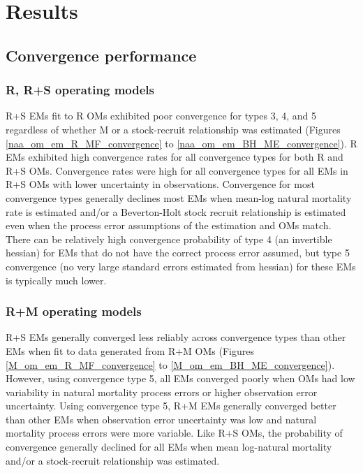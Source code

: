 \documentclass[
  12pt,
]{article}
\begin{document}
\hypertarget{results}{%
\section*{Results}\label{results}}

\hypertarget{convergence-performance}{%
\subsection*{Convergence performance}\label{convergence-performance}}

\hypertarget{r-rs-operating-models}{%
\subsubsection*{R, R+S operating models}\label{r-rs-operating-models}}

R+S EMs fit to R OMs exhibited poor convergence for types 3, 4, and 5
regardless of whether M or a stock-recruit relationship was estimated
(Figures \ref{naa_om_em_R_MF_convergence} to
\ref{naa_om_em_BH_ME_convergence}). R EMs exhibited high convergence
rates for all convergence types for both R and R+S OMs. Convergence
rates were high for all convergence types for all EMs in R+S OMs with
lower uncertainty in observations. Convergence for most convergence
types generally declines most EMs when mean-log natural mortality rate
is estimated and/or a Beverton-Holt stock recruit relationship is
estimated even when the process error assumptions of the estimation and
OMs match. There can be relatively high convergence probability of type
4 (an invertible hessian) for EMs that do not have the correct process
error assumed, but type 5 convergence (no very large standard errors
estimated from hessian) for these EMs is typically much lower.

\hypertarget{rm-operating-models}{%
\subsubsection*{R+M operating models}\label{rm-operating-models}}

R+S EMs generally converged less reliably across convergence types than
other EMs when fit to data generated from R+M OMs (Figures
\ref{M_om_em_R_MF_convergence} to \ref{M_om_em_BH_ME_convergence}).
However, using convergence type 5, all EMs converged poorly when OMs had
low variability in natural mortality process errors or higher
observation error uncertainty. Using convergence type 5, R+M EMs
generally converged better than other EMs when observation error
uncertainty was low and natural mortality process errors were more
variable. Like R+S OMs, the probability of convergence generally
declined for all EMs when mean log-natural mortality and/or a
stock-recruit relationship was estimated.
\end{document}
